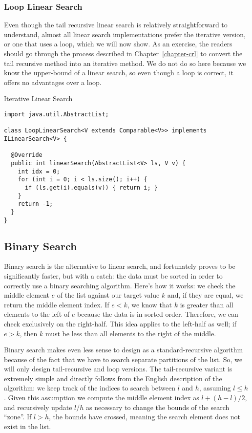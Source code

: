 \subsubsection*{Loop Linear Search}

Even though the tail recursive linear search is relatively straightforward to understand, almost all linear search implementations prefer the iterative version, or one that uses a loop, which we will now show. As an exercise, the readers should go through the process described in Chapter~\ref{chapter-crl} to convert the tail recursive method into an iterative method. We do not do so here because we know the upper-bound of a linear search, so even though a  loop is correct, it offers no advantages over a  loop.

\begin{cl}[]{Iterative Linear Search}
\begin{lstlisting}[language=MyJava]
import java.util.AbstractList;

class LoopLinearSearch<V extends Comparable<V>> implements ILinearSearch<V> {

  @Override
  public int linearSearch(AbstractList<V> ls, V v) {
    int idx = 0;
    for (int i = 0; i < ls.size(); i++) {
      if (ls.get(i).equals(v)) { return i; }
    }
    return -1;
  }
}
\end{lstlisting}
\end{cl}

\subsection*{Binary Search}

Binary search is the alternative to linear search, and fortunately proves to be significantly faster, but with a catch: the data must be sorted in order to correctly use a binary searching algorithm. Here's how it works: we check the middle element $e$ of the list against our target value $k$ and, if they are equal, we return the middle element index. If $e < k$, we know that $k$ is greater than all elements to the left of $e$ because the data is in sorted order. Therefore, we can check exclusively on the right-half. This idea applies to the left-half as well; if $e > k$, then $k$ must be less than all elements to the right of the middle. 

Binary search makes even less sense to design as a standard-recursive algorithm because of the fact that we have to search separate partitions of the list. So, we will only design tail-recursive and loop versions. The tail-recursive variant is extremely simple and directly follows from the English description of the algorithm: we keep track of the indices to search between $l$ and $h$, assuming $l \leq h$. Given this assumption we compute the middle element index as $l + (h - l) / 2$, and recursively update $l$/$h$ as necessary to change the bounds of the search ``zone''. If $l > h$, the bounds have crossed, meaning the search element does not exist in the list. 

